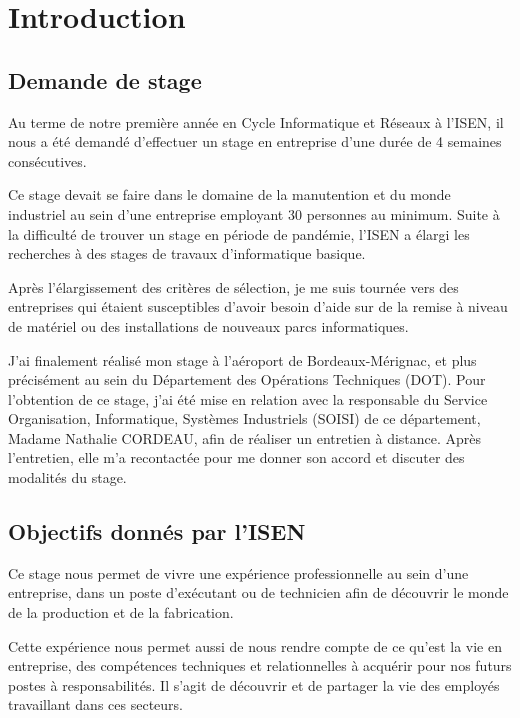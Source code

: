 \chapter{Introduction}


\section{Demande de stage}


Au terme de notre première année en Cycle Informatique et Réseaux à l’ISEN, il nous a été demandé d’effectuer un stage en entreprise d’une durée de 4 semaines consécutives.


Ce stage devait se faire dans le domaine de la manutention et du monde industriel au sein d’une entreprise employant 30 personnes au minimum. Suite à la difficulté de trouver un stage en période de pandémie, l’ISEN a élargi les recherches à des stages de travaux d’informatique basique.\newline


Après l'élargissement des critères de sélection, je me suis tournée vers des entreprises qui étaient susceptibles d'avoir besoin d’aide sur de la remise à niveau de matériel ou des installations de nouveaux parcs informatiques.


J’ai finalement réalisé mon stage à l’aéroport de Bordeaux-Mérignac, et plus précisément au sein du Département des Opérations Techniques (DOT). Pour l’obtention de ce stage, j’ai été mise en relation avec la responsable du Service Organisation, Informatique, Systèmes Industriels (SOISI) de ce département, Madame Nathalie CORDEAU, afin de réaliser un entretien à distance. Après l’entretien, elle m'a recontactée pour me donner son accord et discuter des modalités du stage.


\section{Objectifs donnés par l'ISEN}

Ce stage nous permet de vivre une expérience professionnelle au sein d’une entreprise, dans un poste d’exécutant ou de technicien afin de découvrir le monde de la production et de la fabrication.

Cette expérience nous permet aussi de nous rendre compte de ce qu'est la vie en entreprise, des compétences techniques et relationnelles à acquérir pour nos futurs postes à responsabilités. Il s'agit de découvrir et de partager la vie des employés travaillant dans ces secteurs.

